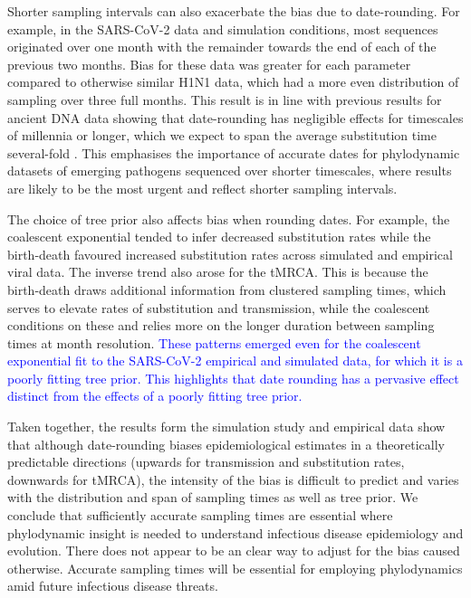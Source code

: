 \documentclass[12pt]{article}
\begin{document}
\begin{spacing}{2}
Shorter sampling intervals can also exacerbate the bias due to date-rounding. For example, in the SARS-CoV-2 data and simulation conditions, most sequences originated over one month with the remainder towards the end of each of the previous two months. Bias for these data was greater for each parameter compared to otherwise similar H1N1 data, which had a more even distribution of sampling over three full months. This result is in line with previous results for ancient DNA data showing that date-rounding has negligible effects for timescales of millennia or longer, which we expect to span the average substitution time several-fold \citep{molak_2013_phylogenetic}. This emphasises the importance of accurate dates for phylodynamic datasets of emerging pathogens sequenced over shorter timescales, where results are likely to be the most urgent and reflect shorter sampling intervals.

The choice of tree prior also affects bias when rounding dates. For example, the coalescent exponential tended to infer decreased substitution rates while the birth-death favoured increased substitution rates across simulated and empirical viral data. The inverse trend also arose for the tMRCA. This is because the birth-death draws additional information from clustered sampling times, which serves to elevate rates of substitution and transmission, while the coalescent conditions on these and relies more on the longer duration between sampling times at month resolution. \textcolor{blue}{These patterns emerged even for the coalescent exponential fit to the SARS-CoV-2 empirical and simulated data, for which it is a poorly fitting tree prior. This highlights that date rounding has a pervasive effect distinct from the effects of a poorly fitting tree prior.}

Taken together, the results form the simulation study and empirical data show that although date-rounding biases epidemiological estimates in a theoretically predictable directions (upwards for transmission and substitution rates, downwards for tMRCA), the intensity of the bias is difficult to predict and varies with the distribution and span of sampling times as well as tree prior. We conclude that sufficiently accurate sampling times are essential where phylodynamic insight is needed to understand infectious disease epidemiology and evolution. There does not appear to be an clear way to adjust for the bias caused otherwise. Accurate sampling times will be essential for employing phylodynamics amid future infectious disease threats.


\end{spacing}
\end{document}
